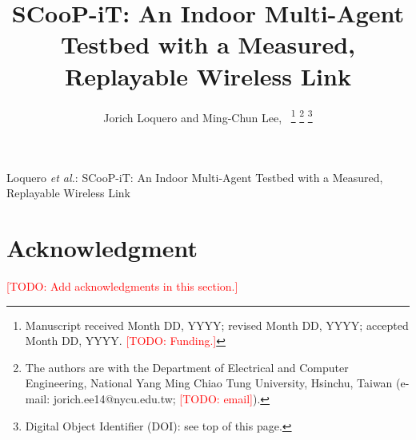 \documentclass[journal]{IEEEtran}
\newcommand{\todo}[1]{\textcolor{red}{[TODO: #1]}}
\begin{document}
\title{SCooP-iT: An Indoor Multi-Agent Testbed
with a Measured, Replayable Wireless Link}

\author{Jorich Loquero and Ming-Chun Lee,~%
\thanks{Manuscript received Month DD, YYYY; revised Month DD, YYYY;
accepted Month DD, YYYY. \todo{Funding.}}%
\thanks{The authors are with the Department of Electrical and Computer
Engineering, National Yang Ming Chiao Tung University, Hsinchu, Taiwan
(e-mail: jorich.ee14@nycu.edu.tw; \todo{email}).}%
\thanks{Digital Object Identifier (DOI): see top of this page.}}

%
{Loquero \MakeLowercase{\textit{et al.}}: SCooP-iT: An Indoor Multi-Agent Testbed with a Measured, Replayable Wireless Link}

\maketitle

























\section*{Acknowledgment}
\todo{Add acknowledgments in this section.}




\end{document}
